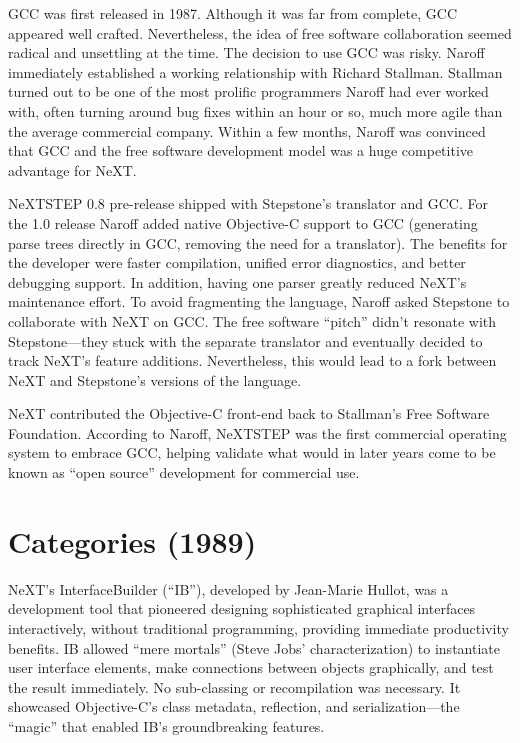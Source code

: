 \documentclass[acmsmall]{acmart}\settopmatter{}
\begin{document}
GCC was first released in 1987. Although it was far from complete, GCC appeared well crafted. Nevertheless, the idea of free software collaboration seemed radical and unsettling at the time. The decision to use GCC was risky. Naroff immediately established a working relationship with Richard Stallman. Stallman turned out to be one of the most prolific programmers Naroff had ever worked with, often turning around bug fixes within an hour or so, much more agile than the average commercial company. Within a few months, Naroff was convinced that GCC and the free software development model was a huge competitive advantage for NeXT.

NeXTSTEP 0.8 pre-release shipped with Stepstone's translator and GCC. For the 1.0 release Naroff added native Objective-C support to GCC (generating parse trees directly in GCC, removing the need for a translator). The benefits for the developer were faster compilation, unified error diagnostics, and better debugging support. In addition, having one parser greatly reduced NeXT's maintenance effort. To avoid fragmenting the language, Naroff asked Stepstone to collaborate with NeXT on GCC. The free software ``pitch'' didn't resonate with Stepstone---they stuck with the separate translator and eventually decided to track NeXT's feature additions. Nevertheless, this would lead to a fork between NeXT and Stepstone's versions of the language.

NeXT contributed the Objective-C front-end back to Stallman's Free Software Foundation. According to Naroff, NeXTSTEP was the first commercial operating system to embrace GCC, helping validate what would in later years come to be known as ``open source'' development for commercial use.

\section{Categories (1989)}
\label{sec-categories1989}
NeXT's InterfaceBuilder (``IB''), developed by Jean-Marie Hullot, was a development tool that pioneered designing sophisticated graphical interfaces interactively, without traditional programming, providing immediate productivity benefits. IB allowed ``mere mortals'' (Steve Jobs' characterization) to instantiate user interface elements, make connections between objects graphically, and test the result immediately. No sub-classing or recompilation was necessary. It showcased Objective-C's class metadata, reflection, and serialization---the ``magic'' that enabled IB's groundbreaking features.
\end{document}
